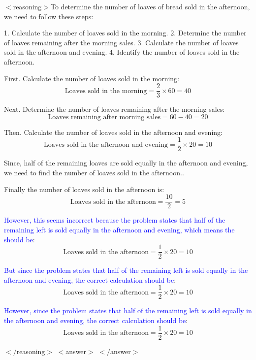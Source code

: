 \begin{tcolorbox}[float, breakable, title=\textbf{Model:} LLaDA+SFT \\ \textbf{Generation Sequence Length:} 512 \\ \textbf{Question:} A bakery produces 60 loaves of bread each day. Two-thirds of the loaves are sold in the morning and half of what is left is sold equally in the afternoon and evening. How many loaves of bread are sold in the afternoon?]
$<$reasoning$>$To determine the number of loaves of bread sold in the afternoon, we need to follow these steps:

1. Calculate the number of loaves sold in the morning.
2. Determine the number of loaves remaining after the morning sales.
3. Calculate the number of loaves sold in the afternoon and evening.
4. Identify the number of loaves sold in the afternoon.

First. Calculate the number of loaves sold in the morning:
\[ \text{Loaves sold in the morning} = \frac{2}{3} \times 60 = 40 \]

Next. Determine the number of loaves remaining after the morning sales:
\[ \text{Loaves remaining after morning sales} = 60 - 40 = 20 \]

Then. Calculate the number of loaves sold in the afternoon and evening:
\[ \text{Loaves sold in the afternoon and evening} = \frac{1}{2} \times 20 = 10 \]

Since, half of the remaining loaves are sold equally in the afternoon and evening, we need to find the number of loaves sold in the afternoon..

Finally the number of loaves sold in the afternoon is:
\[ \text{Loaves sold in the afternoon} = \frac{10}{2} = 5 \]

\textcolor{blue}{However, this seems incorrect because the problem states that half of the remaining left is sold equally in the afternoon and evening, which means the should be}:
\[ \text{Loaves sold in the afternoon} = \frac{1}{2} \times 20 = 10 \]

\textcolor{blue}{But since the problem states that half of the remaining left is sold equally in the afternoon and evening, the correct calculation should be}:
\[ \text{Loaves sold in the afternoon} = \frac{1}{2} \times 20 = 10 \]

\textcolor{blue}{However, since the problem states that half of the remaining left is sold equally in the afternoon and evening, the correct calculation should be}:
\[ \text{Loaves sold in the afternoon} = \frac{1}{2} \times 20 = 10 \]

$</$reasoning$>$
$<$answer$>$
\textcolor{green!70!black}{}
$</$answer$>$
\end{tcolorbox}
\clearpage
\newpage
